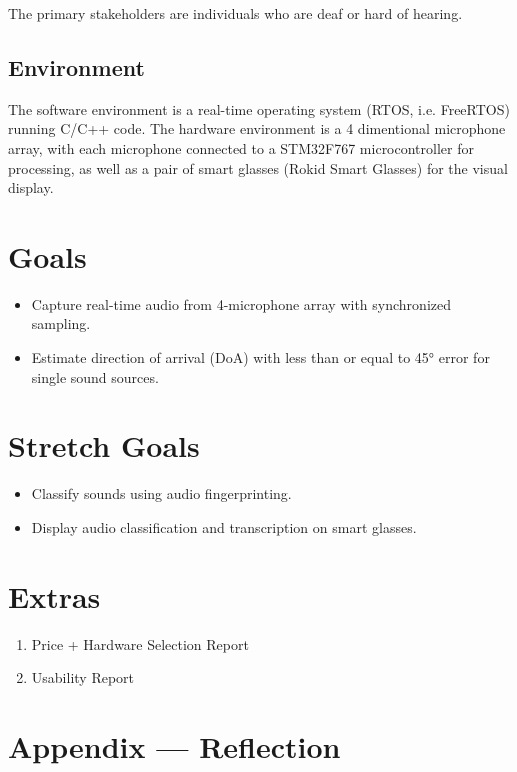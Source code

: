 \documentclass{article}
\begin{document}
The primary stakeholders are individuals who are deaf or hard of hearing.

\subsection{Environment}

The software environment is a real-time operating system (RTOS, i.e. FreeRTOS) running C/C++ code.
The hardware environment is a 4 dimentional microphone array, with each microphone connected to a STM32F767 microcontroller for processing, as well as a pair of smart glasses (Rokid Smart Glasses) for the visual display.

\section{Goals}

\begin{itemize}
    \item Capture real-time audio from 4-microphone array with synchronized sampling.
    \item Estimate direction of arrival (DoA) with less than or equal to 45° error for single sound sources.
\end{itemize}
\section{Stretch Goals}

\begin{itemize}
    \item Classify sounds using audio fingerprinting.
    \item Display audio classification and transcription on smart glasses.
\end{itemize}
\section{Extras}

\begin{enumerate}
    \item Price + Hardware Selection Report
    \item Usability Report
\end{enumerate} 

\newpage{}

\section*{Appendix --- Reflection}
\end{document}
